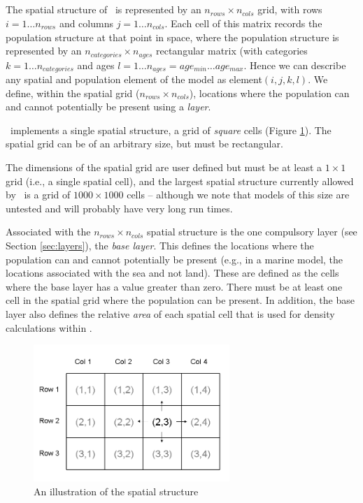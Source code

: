 \subsection{\label{sec:spatial-structure}}

The spatial structure of \SPM\ is represented by an $n_{rows} \times n_{cols}$ grid, with rows $i=1 \dots n_{rows}$ and columns $j=1 \ldots n_{cols}$. Each cell of this matrix records the population structure at that point in space, where the population structure is represented by an $n_{categories} \times n_{ages}$ rectangular matrix (with categories $k=1 \ldots n_{categories}$ and ages $l=1 \ldots n_{ages} = age_{min} \ldots age_{max}$. Hence we can describe any spatial and population element of the model as element$(i,j,k,l)$. We define, within the spatial grid ($n_{rows} \times n_{cols}$), locations where the population can and cannot potentially be present using a \emph{layer}. 

\SPM\ implements a single spatial structure, a grid of \emph{square} cells (Figure \ref{fig:SquareSpatialStructure}). The spatial grid can be of an arbitrary size, but must be rectangular. 

The dimensions of the spatial grid are user defined but must be at least a $1 \times 1$ grid (i.e., a single spatial cell), and the largest spatial structure currently allowed by \SPM\ is a grid of $1000 \times 1000$ cells -- although we note that models of this size are untested and will probably have very long run times. 

Associated with the $n_{rows} \times n_{cols}$ spatial structure is the one compulsory layer (see Section \ref{sec:layers}), the \emph{base layer}. This defines the locations where the population can and cannot potentially be present (e.g., in a marine model, the locations associated with the sea and not land). These are defined as the cells where the base layer has a value greater than zero. There must be at least one cell in the spatial grid where the population can be present. In addition, the base layer also defines the relative \emph{area} of each spatial cell that is used for density calculations within \SPM.

\begin{figure}[htp]
 \centering
	\includegraphics[width=0.66\textwidth]{Figures/SquareStructure}
  \caption{An illustration of the spatial structure}
  \label{fig:SquareSpatialStructure}
\end{figure}

